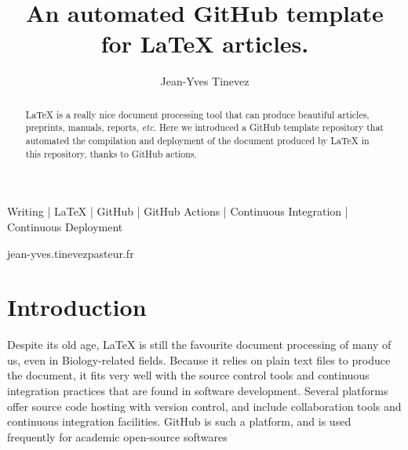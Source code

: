 
\title{An automated GitHub template for LaTeX articles.}


\author[1\space\Letter]{Jean-Yves Tinevez}


\maketitle

\begin{abstract} %

LaTeX is a really nice document processing tool that can produce beautiful articles, preprints, manuals, reports, \textit{etc}.
Here we introduced a GitHub template repository that automated the compilation and deployment of the document produced by LaTeX in this repository, thanks to GitHub actions.
\end{abstract}


\begin{keywords}
    Writing | LaTeX | GitHub | GitHub Actions | Continuous Integration | Continuous Deployment
\end{keywords}


\begin{corrauthor}
    jean-yves.tinevez\at pasteur.fr
\end{corrauthor}



\section*{Introduction}

Despite its old age, LaTeX is still the favourite document processing of many of us, even in Biology-related fields.
Because it relies on plain text files to produce the document, it fits very well with the source control tools and continuous integration practices that are found in software development.
Several platforms offer source code hosting with version control, and include collaboration tools and continuous integration facilities. 
GitHub is such a platform, and is used frequently for academic open-source softwares
